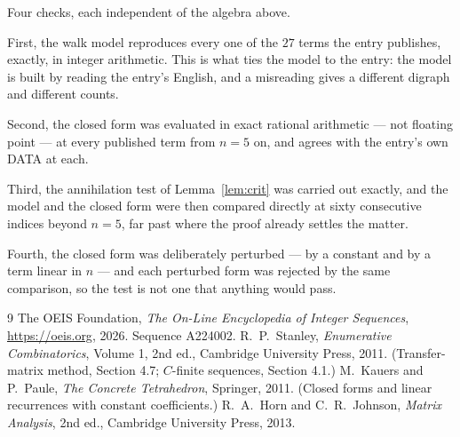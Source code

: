 \documentclass[11pt,a4paper]{article}
\theoremstyle{plain}
\theoremstyle{definition}
\begin{document}
Four checks, each independent of the algebra above.

First, the walk model reproduces every one of the $27$ terms the entry publishes,
exactly, in integer arithmetic. This is what ties the model to the entry: the model is built
by reading the entry's English, and a misreading gives a different digraph and different
counts.

Second, the closed form was evaluated in exact rational arithmetic --- not floating point ---
at every published term from $n=5$ on, and agrees with the entry's own DATA at each.

Third, the annihilation test of Lemma~\ref{lem:crit} was carried out exactly, and the model
and the closed form were then compared directly at sixty consecutive indices beyond
$n=5$, far past where the proof already settles the matter.

Fourth, the closed form was deliberately perturbed --- by a constant and by a term linear in
$n$ --- and each perturbed form was rejected by the same comparison, so the test is not one
that anything would pass.

\begin{thebibliography}{9}
 The OEIS Foundation, \emph{The On-Line Encyclopedia of Integer
Sequences}, \url{https://oeis.org}, 2026. Sequence A224002.
 R.~P.~Stanley, \emph{Enumerative Combinatorics}, Volume 1, 2nd ed.,
Cambridge University Press, 2011. (Transfer-matrix method, Section 4.7; $C$-finite sequences,
Section 4.1.)
 M.~Kauers and P.~Paule, \emph{The Concrete Tetrahedron}, Springer, 2011.
(Closed forms and linear recurrences with constant coefficients.)
 R.~A.~Horn and C.~R.~Johnson, \emph{Matrix Analysis}, 2nd ed., Cambridge
University Press, 2013.
\end{thebibliography}
\end{document}
